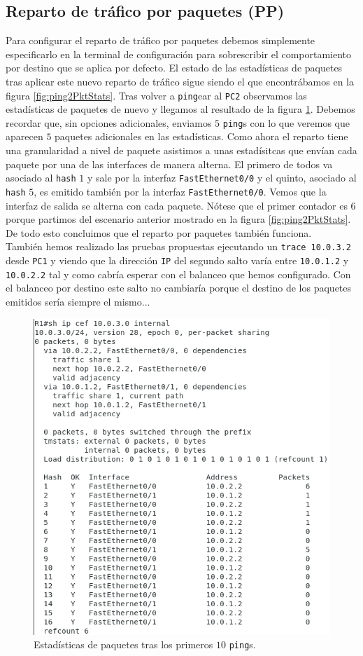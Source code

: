 \documentclass[11pt]{article}
\begin{document}
        \subsection{Reparto de tráfico por paquetes (PP)}
            Para configurar el reparto de tráfico por paquetes debemos simplemente especificarlo en la terminal de configuración para sobrescribir el comportamiento por destino que se aplica por defecto. El estado de las estadísticas de paquetes tras aplicar este nuevo reparto de tráfico sigue siendo el que encontrábamos en la figura \ref{fig:ping2PktStats}. Tras volver a \texttt{ping}ear al \texttt{PC2} observamos las estadísticas de paquetes de nuevo y llegamos al resultado de la figura \ref{fig:ping3PktStatsPP}. Debemos recordar que, sin opciones adicionales, enviamos $5$ \texttt{ping}s con lo que veremos que aparecen $5$ paquetes adicionales en las estadísticas. Como ahora el reparto tiene una granularidad a nivel de paquete asistimos a unas estadísitcas que envían cada paquete por una de las interfaces de manera alterna. El primero de todos va asociado al \texttt{hash} $1$ y sale por la interfaz \texttt{FastEthernet0/0} y el quinto, asociado al \texttt{hash} $5$, es emitido también por la interfaz \texttt{FastEthernet0/0}. Vemos que la interfaz de salida se alterna con cada paquete. Nótese que el primer contador es $6$ porque partimos del escenario anterior mostrado en la figura \ref{fig:ping2PktStats}. De todo esto concluimos que el reparto por paquetes también funciona.\\

            También hemos realizado las pruebas propuestas ejecutando un \texttt{trace 10.0.3.2} desde \texttt{PC1} y viendo que la dirección \texttt{IP} del segundo salto varía entre \texttt{10.0.1.2} y \texttt{10.0.2.2} tal y como cabría esperar con el balanceo que hemos configurado. Con el balanceo por destino este salto no cambiaría porque el destino de los paquetes emitidos sería siempre el mismo...

            \begin{figure}
                \centering
                \includegraphics[width=0.6\linewidth]{ping3PktStatsPP.png}
                \caption{Estadísticas de paquetes tras los primeros $10$ \texttt{ping}s.}
                \label{fig:ping3PktStatsPP}
            \end{figure}
\end{document}
